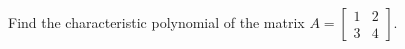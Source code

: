 Find the characteristic polynomial of the matrix 
$A = \begin{bmatrix} 
1 & 2\\
3 & 4 
\end{bmatrix}$.